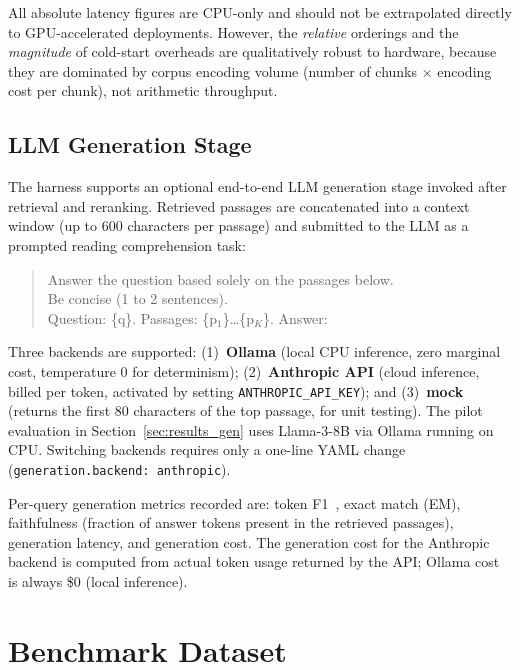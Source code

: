 \documentclass[11pt,a4paper]{article}
\begin{document}
All absolute latency figures are CPU-only and should not be extrapolated
directly to GPU-accelerated deployments.
However, the \emph{relative} orderings and the \emph{magnitude} of cold-start
overheads are qualitatively robust to hardware, because they are dominated by
corpus encoding volume (number of chunks $\times$ encoding cost per chunk),
not arithmetic throughput.

\subsection{LLM Generation Stage}
\label{sec:generation}

The harness supports an optional end-to-end LLM generation stage invoked
after retrieval and reranking.
Retrieved passages are concatenated into a context window (up to 600
characters per passage) and submitted to the LLM as a prompted reading
comprehension task:

\begin{quote}\small\ttfamily
Answer the question based solely on the passages below.\\
Be concise (1 to 2 sentences).\\
Question: \{q\}. Passages: \{p$_1$\}\ldots\{p$_K$\}. Answer:
\end{quote}

Three backends are supported: (1)~\textbf{Ollama} (local CPU inference,
zero marginal cost, temperature 0 for determinism); (2)~\textbf{Anthropic API}
(cloud inference, billed per token, activated by setting \texttt{ANTHROPIC\_API\_KEY}); and
(3)~\textbf{mock} (returns the first 80 characters of the top passage, for
unit testing).
The pilot evaluation in Section~\ref{sec:results_gen} uses Llama-3-8B via
Ollama running on CPU.
Switching backends requires only a one-line YAML change
(\texttt{generation.backend: anthropic}).

Per-query generation metrics recorded are: token F1~\citep{yang2018hotpotqa},
exact match (EM), faithfulness (fraction of answer tokens present in the
retrieved passages), generation latency, and generation cost.
The generation cost for the Anthropic backend is computed from actual
token usage returned by the API; Ollama cost is always \$0 (local inference).

\section{Benchmark Dataset}
\label{sec:benchmarks}
\end{document}
